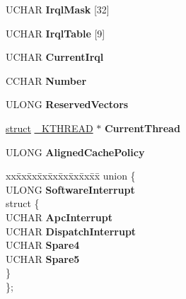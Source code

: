 \begin{DoxyCompactItemize}
\begin{tabbing}
\end{tabbing}\item 
\mbox{\label{struct___k_i_p_c_r_a85705c1b91cf0478513a08b95d1b10fd}} 
U\+C\+H\+AR {\bfseries Irql\+Mask} \mbox{[}32\mbox{]}
\item 
\mbox{\label{struct___k_i_p_c_r_af8583469b6bfc618e168b932e8bbc19a}} 
U\+C\+H\+AR {\bfseries Irql\+Table} \mbox{[}9\mbox{]}
\item 
\mbox{\label{struct___k_i_p_c_r_a200342f424a6a086d72aed487a4d9a7a}} 
U\+C\+H\+AR {\bfseries Current\+Irql}
\item 
\mbox{\label{struct___k_i_p_c_r_a49e0bb941a37b962652a41c0880b5038}} 
C\+C\+H\+AR {\bfseries Number}
\item 
\mbox{\label{struct___k_i_p_c_r_a0652306c9832baa25eaaadd87a397d00}} 
U\+L\+O\+NG {\bfseries Reserved\+Vectors}
\item 
\mbox{\label{struct___k_i_p_c_r_a6147d139603cd8199c575ff1ca7f388b}} 
\hyperlink{interfacestruct}{struct} \hyperlink{struct___k_t_h_r_e_a_d}{\+\_\+\+K\+T\+H\+R\+E\+AD} $\ast$ {\bfseries Current\+Thread}
\item 
\mbox{\label{struct___k_i_p_c_r_aa9a6103df8709209173b19aea40fc0e1}} 
U\+L\+O\+NG {\bfseries Aligned\+Cache\+Policy}
\item 
\mbox{\label{struct___k_i_p_c_r_a3fe55c2bb0ec5d090874bf4bd20fb2b3}} 
\begin{tabbing}
xx\=xx\=xx\=xx\=xx\=xx\=xx\=xx\=xx\=\kill
union \{\\
\>ULONG {\bfseries SoftwareInterrupt}\\
\mbox{\label{union___k_i_p_c_r_1_1_0D2195_a19e4cf8f5cf597b28efcbf804f6cbdc9}} 
\>struct \{\\
\>\>UCHAR {\bfseries ApcInterrupt}\\
\>\>UCHAR {\bfseries DispatchInterrupt}\\
\>\>UCHAR {\bfseries Spare4}\\
\>\>UCHAR {\bfseries Spare5}\\
\>\} \\
\}; \\


\end{tabbing}
\end{DoxyCompactItemize}
